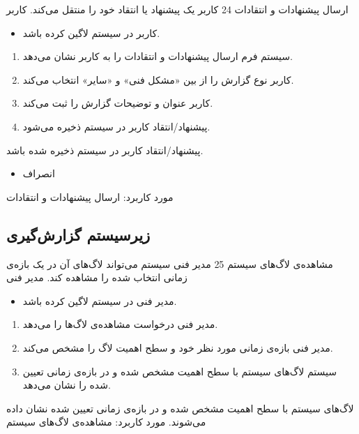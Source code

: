 {
	\usecase
	{
 ارسال پیشنهادات و انتقادات
	}
	{24}
	{
کاربر یک پیشنهاد یا انتقاد خود را منتقل می‌کند.
	}
	{
کاربر
	}
	{}
	{
		\begin{itemize}
			\vspace*{-0.6cm}
			\item 
			کاربر در سیستم لاگین کرده باشد.
		\end{itemize}
	}
	{
		\begin{enumerate}
						\item
سیستم فرم ارسال پیشنهادات و انتقادات را به کاربر نشان می‌دهد.
			\item
کاربر نوع گزارش را از بین «مشکل فنی» و «سایر» انتخاب می‌کند.
			\item 
			کاربر عنوان و توضیحات گزارش را ثبت می‌کند.
			\item 
پیشنهاد/انتقاد کاربر در سیستم ذخیره می‌شود.
		\end{enumerate}
	}
	{
پیشنهاد/انتقاد کاربر در سیستم ذخیره شده باشد.
	}
	{
		\begin{itemize}
			\vspace*{-0.6cm}
			\item 
			انصراف
		\end{itemize}
	}
	{
		مورد کاربرد: ارسال پیشنهادات و انتقادات
	}
	
	
	
}

\newpage
\subsection{زیرسیستم گزارش‌گیری}


{
\usecase
{
	مشاهده‌ی لاگ‌های سیستم
}
{25}
{
مدیر فنی سیستم می‌تواند لاگ‌های آن در یک بازه‌ی زمانی انتخاب شده را مشاهده کند.
}
{
	مدیر فنی
}
{}
{
	\begin{itemize}
		\vspace*{-0.6cm}
		\item 
مدیر فنی در سیستم لاگین کرده باشد.
	\end{itemize}
}
{
	\vspace*{-0.6cm}
	\begin{enumerate}
		\item 
مدیر فنی درخواست مشاهده‌ی لاگ‌ها را می‌دهد.
		\item
		مدیر فنی بازه‌ی زمانی مورد نظر خود و سطح اهمیت لاگ را مشخص می‌کند.
		\item
		سیستم لاگ‌های سیستم با سطح اهمیت مشخص شده و در بازه‌ی زمانی تعیین شده را نشان می‌دهد.		
	\end{enumerate}
}
{
لاگ‌های سیستم با سطح اهمیت مشخص شده و در بازه‌ی زمانی تعیین شده نشان داده می‌شوند.
}
{
}
{
	مورد کاربرد: مشاهده‌ی لاگ‌های سیستم
}
}

